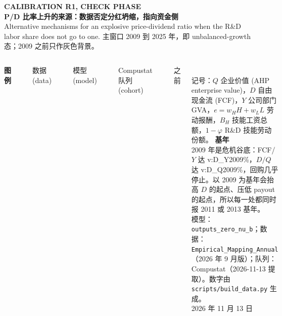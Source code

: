 \documentclass[aspectratio=169,10pt]{beamer}
\newcommand{\val}[1]{\csname v:#1\endcsname}
\newcommand{\en}[1]{\textcolor{inksec}{#1}}
\begin{document}
\begin{frame}[plain]
\vspace{1.2cm}
{\scriptsize\textcolor{muted}{\textbf{CALIBRATION R1, CHECK PHASE}}}\\[0.3cm]
{\Large\textbf{P/D 比率上升的来源：数据否定分红坍缩，指向资金侧}}\\[0.35cm]
{\normalsize\textcolor{inksec}{Alternative mechanisms for an explosive price-dividend ratio when the R\&D labor share does not go to one. 主窗口 2009 到 2025 年，即 unbalanced-growth 态；2009 之前只作灰色背景。}}\\[0.6cm]
\begin{columns}[T]
{\small\textbf{图例}}\\[0.15cm]
{\small\textcolor{dataC}{\rule{1cm}{2.2pt}}\; 数据 \en{(data)}\quad \textcolor{modelC}{\rule{1cm}{2.2pt}}\; 模型 \en{(model)}\quad \textcolor{greenC}{\rule{1cm}{2.2pt}}\; Compustat 队列 \en{(cohort)}\quad \textcolor{ctxc}{\rule{1cm}{2.2pt}} 之前}\\[0.25cm]
{\small 记号：$Q$ 企业价值 \en{(AHP enterprise value)}，$D$ 自由现金流 \en{(FCF)}，$Y$ 公司部门 GVA，$e=w_HH+w_LL$ 劳动报酬，$B_H$ 技能工资总额，$1-\varphi$ R\&D 技能劳动份额。}
{\small\textbf{基年}}\\[0.15cm]
{\small 2009 年是危机谷底：FCF/$Y$ 达 \val{D_Y2009}\%，$D/Q$ 达 \val{D_Q2009}\%，回购几乎停止。以 2009 为基年会抬高 $D$ 的起点、压低 payout 的起点，所以每一处都同时报 2011 或 2013 基年。}\\[0.3cm]
{\small 模型：\texttt{outputs\_zero\_nu\_b}；数据：\texttt{Empirical\_Mapping\_Annual}（2026 年 9 月版）；队列：Compustat（2026-11-13 提取）。数字由 \texttt{scripts/build\_data.py} 生成。}\\[0.2cm]
{\scriptsize\textcolor{muted}{2026 年 11 月 13 日}}
\end{columns}
\end{frame}
\end{document}
